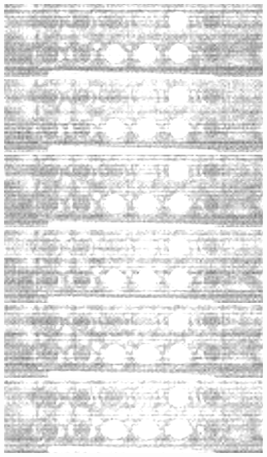\documentclass{beamer}
\begin{document}
\begin{frame}
        \includegraphics[height=0.023\textheight]{spatial-denoised/wavelet_den_25.png}
        \includegraphics[height=0.023\textheight]{spatial-denoised/wavelet_den_26.png}
        \includegraphics[height=0.023\textheight]{spatial-denoised/wavelet_den_27.png}
        \includegraphics[height=0.023\textheight]{spatial-denoised/wavelet_den_28.png}
        \includegraphics[height=0.023\textheight]{spatial-denoised/wavelet_den_29.png}
        \includegraphics[height=0.023\textheight]{spatial-denoised/wavelet_den_30.png}\\

\end{frame}
\end{document}
